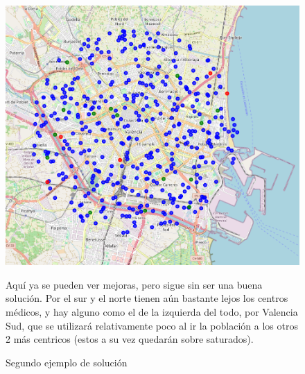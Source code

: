 \documentclass[12pt,a4paper]{book}
\begin{document}
\begin{figure}[H]
    \centering
    \begin{minipage}[c]{0.45\textwidth}
        \includegraphics[width=\textwidth]{images/solucion_ejemplo_2.png}
        \label{fig:ejemplo_2}
    \end{minipage}
    \hfill
    \begin{minipage}[c]{0.45\textwidth}
        Aquí ya se pueden ver mejoras, pero sigue sin ser una buena solución. Por el sur y el norte tienen aún bastante lejos los centros médicos, y hay alguno como el de la izquierda del todo, por Valencia Sud, que se utilizará relativamente poco al ir la población a los otros 2 más centricos (estos a su vez quedarán sobre saturados).
    \end{minipage}
    \caption{Segundo ejemplo de solución}
\end{figure}
\end{document}
